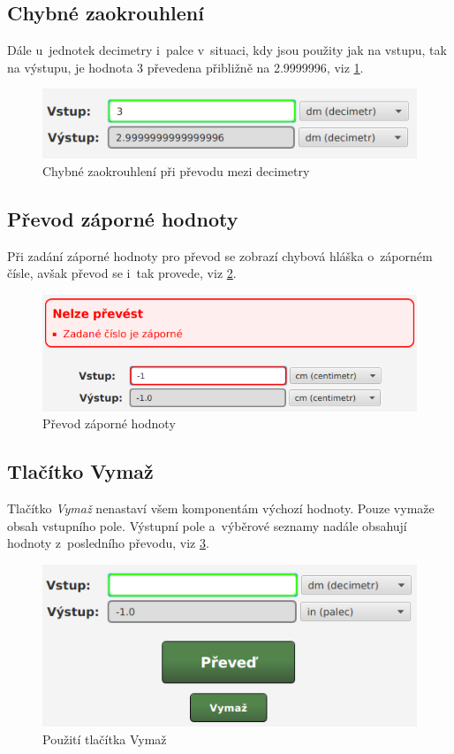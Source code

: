 		\subsection{Chybné zaokrouhlení}
		Dále u~jednotek decimetry i~palce v~situaci, kdy jsou použity jak na vstupu, tak na výstupu, je hodnota 3 převedena přibližně na 2.9999996, viz \ref{Zaokrouhleni}.
			\begin{figure}[ht!]
				\centering
				\caption{Chybné zaokrouhlení při převodu mezi decimetry}
				\label{Zaokrouhleni}
				\includegraphics[width=13.5cm]{img/Chyby/Zaokrouhleni.png}
			\end{figure}
			\FloatBarrier
		
		\subsection{Převod záporné hodnoty}
		Při zadání záporné hodnoty pro převod se zobrazí chybová hláška o~záporném čísle, avšak převod se i~tak provede, viz \ref{ZapornaHodnota}.
			\begin{figure}[ht!]
				\centering
				\caption{Převod záporné hodnoty}
				\label{ZapornaHodnota}
				\includegraphics[width=13.5cm]{img/Chyby/ZapornaHodnota.png}
			\end{figure}
			\FloatBarrier
		
		\subsection{Tlačítko Vymaž}
		Tlačítko \emph{Vymaž} nenastaví všem komponentám výchozí hodnoty. Pouze vymaže obsah vstupního pole. Výstupní pole a~výběrové seznamy nadále obsahují hodnoty z~posledního převodu, viz \ref{Vymazani}.
			\begin{figure}[ht!]
				\centering
				\caption{Použití tlačítka Vymaž}
				\label{Vymazani}
				\includegraphics[width=13.5cm]{img/Chyby/Vymazani.png}
			\end{figure}